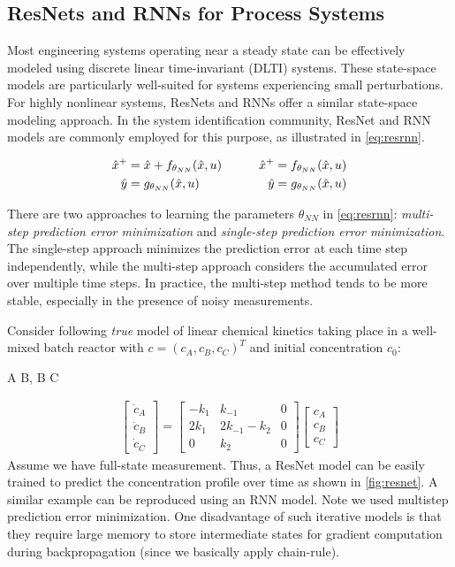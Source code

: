 \documentclass[fontsize=11pt]{article}
\theoremstyle{definition}
\begin{document}
\subsection{ResNets and RNNs for Process Systems}

Most engineering systems operating near a steady state can be effectively modeled 
using discrete linear time-invariant (DLTI) systems. These state-space models are 
particularly well-suited for systems experiencing small perturbations.
For highly nonlinear systems, ResNets and RNNs offer a similar state-space modeling 
approach. In the system identification community, ResNet and RNN models are commonly 
employed for this purpose, as illustrated in \cref{eq:resrnn}.

\begin{align}
    \hat{x}^+ &= \hat{x} + f_{\theta_{NN}} (\hat{x}, u) &\qquad \hat{x}^+ = f_{\theta_{NN}} (\hat{x}, u)\notag \\ 
    \hat{y} &= g_{\theta_{NN}} (\hat{x}, u) &\qquad \hat{y} = g_{\theta_{NN}} (\hat{x}, u)
    \label{eq:resrnn}
\end{align}

There are two approaches to learning the parameters $\theta_{NN}$ in \cref{eq:resrnn}: 
\textit{multi-step prediction error minimization} and \textit{single-step prediction 
error minimization}. 
The single-step approach minimizes the prediction error at each time step independently, 
while the multi-step approach considers the accumulated error over multiple time steps. 
In practice, the multi-step method tends to be more stable, especially in the presence 
of noisy measurements.

Consider following \textit{true} model of linear chemical kinetics taking place
in a well-mixed batch reactor with $c = (c_A, c_B, c_C)^T$ and initial concentration
$c_0$:
\begin{rxn*}{} 
A  B, \qquad  B \rarrow[k_2] C
\label{rxn:atobtoc}
\end{rxn*}
\begin{gather}
\begin{bmatrix} \dot{c}_A \\ \dot{c}_B \\ \dot{c}_C \end{bmatrix}
=\begin{bmatrix}
    -k_{1} & k_{-1} & 0 \\
    2k_{1} & 2k_{-1} - k_2 & 0 \\
    0 & k_{2} & 0
\end{bmatrix}
\begin{bmatrix}  c_A \\ c_B \\ c_C \end{bmatrix} 
\label{eq:atobtoc}
\end{gather}
Assume we have full-state measurement. Thus, a ResNet model can be easily trained
to predict the concentration profile over time as shown in \cref{fig:resnet}. A similar
example can be reproduced using an RNN model. Note we used multistep prediction error
minimization. One disadvantage of such iterative models is that they require large memory
to store intermediate states for gradient computation during backpropagation (since we basically
apply chain-rule).
\end{document}
